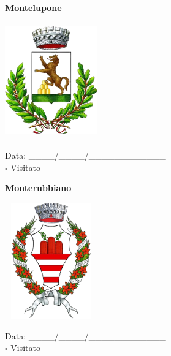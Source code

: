 \documentclass[a5paper,12pt]{article}
\begin{document}
\vspace{0.7cm}

\noindent
\begin{minipage}[t]{0.45\textwidth}
    \begin{center}
        \textbf{Montelupone}
    \end{center}
    \vspace{-0.5cm} %
    \begin{center}
        \includegraphics[height= 5cm, width=4cm]{Marche/Stemma Montelupone.png}
    \end{center}
    \vspace{-0.4cm} %
    \begin{flushleft}
        Data: \_\_\_\_/\_\_\_\_/\_\_\_\_\_\_\_\_\_\_\_\_ \\
        $\square$ Visitato
    \end{flushleft}
\end{minipage}
\hfill
\noindent
\begin{minipage}[t]{0.45\textwidth}
    \begin{center}
        \textbf{Monterubbiano}
    \end{center}
    \vspace{-0.5cm} %
    \begin{center}
        \includegraphics[height= 5cm, width=4cm]{Marche/Stemma Monterubbiano.png}
    \end{center}
    \vspace{-0.4cm} %
    \begin{flushleft}
        Data: \_\_\_\_/\_\_\_\_/\_\_\_\_\_\_\_\_\_\_\_\_ \\
        $\square$ Visitato
    \end{flushleft}
\end{minipage}
\end{document}
